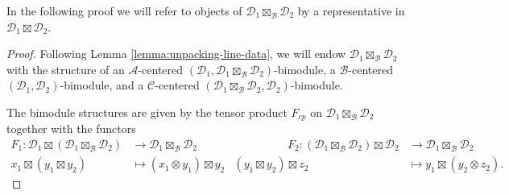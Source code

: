 \documentclass[a4paper]{article}
\numberwithin{equation}{section}
\newcommand{\1}{{\mathrm{1}\mkern-4mu{\mathchoice{}{}{\mskip-0.5mu}{\mskip-1mu}}\mathrm{l}}}
\newcommand{\A}{\mathcal{A}}
\newcommand{\B}{\mathcal{B}}
\newcommand{\C}{\mathcal{C}}
\newcommand{\D}{\mathcal{D}}
\begin{document}
In the following proof we will refer to objects of $\D_1\boxtimes_\B \D_2$ by a representative in $\D_1\boxtimes \D_2$.
\begin{proof}

Following Lemma \ref{lemma:unpacking-line-data}, we will endow $\D_1\boxtimes_\B\D_2$ with the structure of an $\A$-centered $(\D_1, \D_1\boxtimes_\B \D_2)$-bimodule, a $\B$-centered $(\D_1,\D_2)$-bimodule, and a $\C$-centered $(\D_1\boxtimes_\B \D_2,\D_2)$-bimodule.

The bimodule structures are given by the tensor product $F_{cp}$ on $\D_1\boxtimes_\B \D_2$ together with the functors
\begin{equation}
  \begin{aligned}
    F_1 : \D_1 \boxtimes \left( \D_1\boxtimes_\B \D_2\right) &\to \D_1\boxtimes_\B \D_2 &\hspace{2cm} F_2 : \left( \D_1\boxtimes_\B \D_2\right)\boxtimes \D_2 &\to \D_1\boxtimes_\B \D_2\\
    x_1 \boxtimes (y_1 \boxtimes y_2) & \mapsto (x_1\otimes y_1) \boxtimes y_2 &  (y_1\boxtimes y_2) \boxtimes z_2 &\mapsto y_1\boxtimes (y_2\otimes z_2).
  \end{aligned}
\end{equation}


\end{proof}
\end{document}
